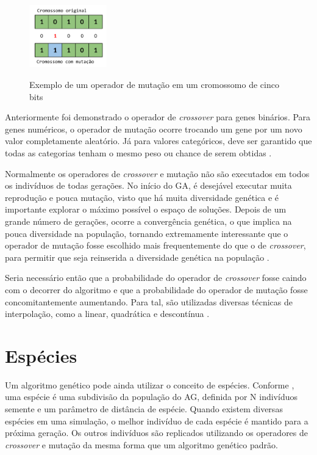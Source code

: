 \documentclass[12pt,oneside,a4paper,english,french,spanish,brazil,]{abntex2}
\begin{document}
\begin{figure}[ht]
\centering
\caption{Exemplo de um operador de mutação em um cromossomo de cinco bits}
\includegraphics[width=0.3\textwidth]{imagens/GA_Mutacao.pdf}
\label{fig:GA_Mutacao}
\end{figure}

Anteriormente foi demonstrado o operador de \textit{crossover} para genes binários. Para genes numéricos, o operador de mutação ocorre trocando um gene por um novo valor completamente aleatório. Já para valores categóricos, deve ser garantido que todas as categorias tenham o mesmo peso ou chance de serem obtidas \cite{linden:2008}.

Normalmente os operadores de \textit{crossover} e mutação não são executados em todos os indivíduos de todas gerações. No início do GA, é desejável executar muita reprodução e pouca mutação, visto que há muita diversidade genética e é importante explorar o máximo possível o espaço de soluções. Depois de um grande número de gerações, ocorre a convergência genética, o que implica na pouca diversidade na população, tornando extremamente interessante que o operador de mutação fosse escolhido mais frequentemente do que o de \textit{crossover}, para permitir que seja reinserida a diversidade genética na população \cite{linden:2008}.

Seria necessário então que a probabilidade do operador de \textit{crossover} fosse caindo com o decorrer do algoritmo e que a probabilidade do operador de mutação fosse concomitantemente aumentando. Para tal, são utilizadas diversas técnicas de interpolação, como a linear, quadrática e descontínua \cite{linden:2008}.

\section{Espécies}

Um algoritmo genético pode ainda utilizar o conceito de espécies. Conforme \citet{li:2002}, uma espécie é uma subdivisão da população do AG, definida por N indivíduos semente e um parâmetro de distância de espécie. Quando existem diversas espécies em uma simulação, o melhor indivíduo de cada espécie é mantido para a próxima geração. Os outros indivíduos são replicados utilizando os operadores de \textit{crossover} e mutação da mesma forma que um algoritmo genético padrão.
\end{document}
